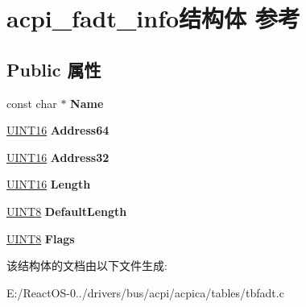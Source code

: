 \hypertarget{structacpi__fadt__info}{}\section{acpi\+\_\+fadt\+\_\+info结构体 参考}
\label{structacpi__fadt__info}
\subsection*{Public 属性}
\begin{DoxyCompactItemize}
\item 
\mbox{\label{structacpi__fadt__info_a85499ccc43e1e4f801b0913b43d177a3}} 
const char $\ast$ {\bfseries Name}
\item 
\mbox{\label{structacpi__fadt__info_a35f66b6567be8fe2548eba571e1a4793}} 
\hyperlink{_processor_bind_8h_a09f1a1fb2293e33483cc8d44aefb1eb1}{U\+I\+N\+T16} {\bfseries Address64}
\item 
\mbox{\label{structacpi__fadt__info_ac41867fff6367161665e3f0e125086e4}} 
\hyperlink{_processor_bind_8h_a09f1a1fb2293e33483cc8d44aefb1eb1}{U\+I\+N\+T16} {\bfseries Address32}
\item 
\mbox{\label{structacpi__fadt__info_abd26f1e5bbe6ce4fe89fbc888d15578e}} 
\hyperlink{_processor_bind_8h_a09f1a1fb2293e33483cc8d44aefb1eb1}{U\+I\+N\+T16} {\bfseries Length}
\item 
\mbox{\label{structacpi__fadt__info_ad9b4b2e2bfac87a96fda2e8ce7f13c40}} 
\hyperlink{_processor_bind_8h_ab27e9918b538ce9d8ca692479b375b6a}{U\+I\+N\+T8} {\bfseries Default\+Length}
\item 
\mbox{\label{structacpi__fadt__info_aa4912009ee131ee293c7c74a515232dc}} 
\hyperlink{_processor_bind_8h_ab27e9918b538ce9d8ca692479b375b6a}{U\+I\+N\+T8} {\bfseries Flags}
\end{DoxyCompactItemize}


该结构体的文档由以下文件生成\+:\begin{DoxyCompactItemize}
\item 
E\+:/\+React\+O\+S-\/0../drivers/bus/acpi/acpica/tables/tbfadt.\+c\end{DoxyCompactItemize}
